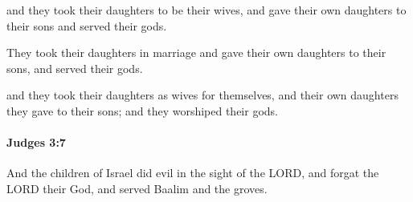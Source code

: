 			\begin{versebox}
					\item[BHS] 
					\item[ASV] and they took their daughters to be their wives, and gave their own daughters to their sons and served their gods.
					\item[NIV] They took their daughters in marriage and gave their own daughters to their sons, and served their gods.
					\item[NRSV] and they took their daughters as wives for themselves, and their own daughters they gave to their sons; and they worshiped their gods.
			\end{versebox}

		\paragraph{Judges 3:7} %
			\label{JUDGES-3-7}

			And the children of Israel did evil in the sight of the LORD, and forgat the LORD their God, and served Baalim and the groves.

